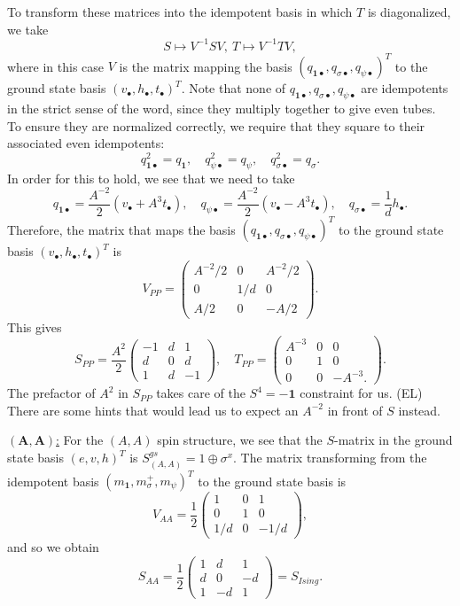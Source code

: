 \documentclass[12pt,a4paper]{article}
\newcommand{\unit}{\mathbf{1}}
\newcommand\be            {\begin{equation}}
\newcommand\ee            {\end{equation}}
\newcommand{\ethan}[1]{{\color{amethyst}\footnotesize{(EL) #1}}}
\begin{document}
To transform these matrices into the idempotent basis in which $T$ is diagonalized, we take 
\be S \mapsto V^{-1}SV,\ T\mapsto V^{-1}TV,\ee 
where in this case $V$ is the matrix mapping the basis $(q_{\unit\bullet},q_{\sigma\bullet},q_{\psi\bullet})^T$ to the ground state basis $(v_\bullet,h_\bullet,t_\bullet)^T$. Note that none of $q_{\unit\bullet},q_{\sigma\bullet},q_{\psi\bullet}$ are idempotents in the strict sense of the word, since they multiply together to give even tubes. To ensure they are normalized correctly, we require that they square to their associated even idempotents:
\be q_{\unit\bullet}^2 = q_\unit,\quad q_{\psi\bullet}^2 = q_\psi,\quad q_{\sigma\bullet}^2 = q_\sigma.\ee
In order for this to hold, we see that we need to take
\be q_{\unit\bullet} = \frac{A^{-2}}{2}(v_\bullet + A^3 t_\bullet),\quad q_{\psi\bullet} = \frac{A^{-2}}{2}(v_\bullet - A^3t_\bullet),\quad q_{\sigma\bullet} = \frac{1}{d}h_\bullet.\ee
Therefore, the matrix that maps the basis $(q_{\unit\bullet},q_{\sigma\bullet},q_{\psi\bullet})^T$ to the ground state basis $(v_\bullet,h_\bullet,t_\bullet)^T$ is 
\be V_{PP} = \begin{pmatrix} A^{-2}/2 & 0 & A^{-2}/2 \\ 0 & 1/d & 0 \\ A/2 & 0 & -A/2 \end{pmatrix}.\ee
This gives 
\be S_{PP} = \frac{A^2}{2} \begin{pmatrix} -1 & d & 1 \\ d & 0 & d \\ 1 & d & -1 \end{pmatrix},\quad T_{PP} = \begin{pmatrix} A^{-3} & 0 & 0 \\ 0 & 1 & 0 \\ 0& 0& -A^{-3}.\end{pmatrix}.\ee
The prefactor of $A^2$ in $S_{PP}$ takes care of the $S^4=-\unit$ constraint for us. 
\ethan{There are some hints that would lead us to expect an $A^{-2}$ in front of $S$ instead.}

\underline{$\mathbf{(A,A)}$:} For the $(A,A)$ spin structure, we see that the $S$-matrix in the ground state basis $(e,v,h)^T$ is $S^{gs}_{(A,A)} = 1\oplus \sigma^x$. The matrix transforming from the idempotent basis $(m_\unit,m_\sigma^+,m_\psi)^T$ to the ground state basis is 
\be V_{AA}= \frac{1}{2}\begin{pmatrix}1&0&1 \\ 0 & 1 & 0\\ 1/d & 0 & -1/d \end{pmatrix},\ee
and so we obtain
\be S_{AA} = \frac{1}{2}\begin{pmatrix} 1 & d & 1 \\ d & 0 & -d \\ 1 & -d & 1 \end{pmatrix} = S_{Ising}.\ee
\end{document}
